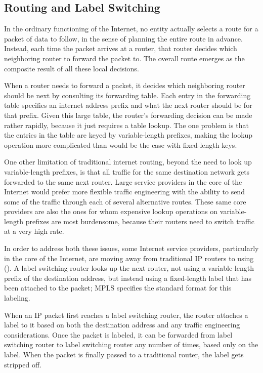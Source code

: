 \subsection{Routing and Label Switching}

In the ordinary functioning of the Internet, no entity actually
selects a route for a packet of data to follow, in the sense of
planning the entire route in advance.  Instead, each time the packet
arrives at a router, that router decides which neighboring router to
forward the packet to.  The overall route emerges as the composite
result of all these local decisions.

When a router needs to forward a packet, it decides which neighboring
router should be next by consulting its forwarding table.  Each entry
in the forwarding table specifies an internet address prefix and what
the next router should be for that prefix.  Given this large table,
the router's forwarding decision can be made rather rapidly, because it
just requires a table lookup.  The one problem is that the entries in
the table are keyed by variable-length prefixes, making the lookup
operation more complicated than would be the case with fixed-length
keys.

One other limitation of traditional internet routing, beyond the need
to look up variable-length prefixes, is that all traffic for the same
destination network gets forwarded to the same next router.  Large
service providers in the core of the Internet would prefer more
flexible traffic engineering with the ability to send some of the
traffic through each of several alternative routes.  These same core
providers are also the ones for whom expensive lookup operations on
variable-length prefixes are most burdensome, because their routers need
to switch traffic at a very high rate.

In order to address both these issues, some Internet service providers,
particularly in the core of the Internet, are moving away from
traditional IP routers to  using
 ().
A label switching router looks up the next router, not using a
variable-length prefix of the destination address, but instead using a
fixed-length label that has been attached to the packet; MPLS
specifies the standard format for this labeling.

When an IP packet first reaches a label switching router, the router
attaches a label to it based on both the destination address and any
traffic engineering considerations.  Once the packet is labeled, it
can be forwarded from label switching router to label switching router
any number of times, based only on the label.  When the packet is
finally passed to a traditional router, the label gets stripped off.

